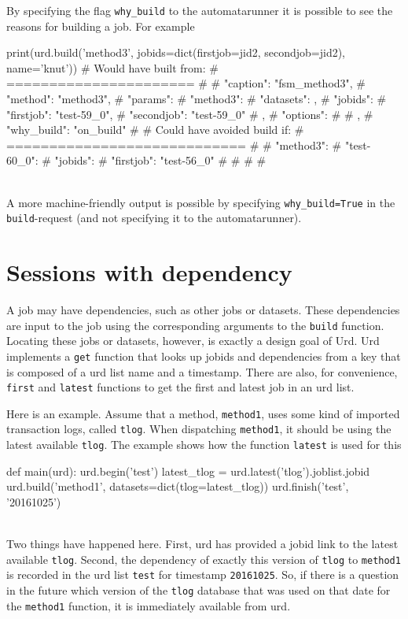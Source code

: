 By specifying the flag \texttt{why\_build} to the automatarunner it is
possible to see the reasons for building a job.  For example
\\
\begin{python}
  print(urd.build('method3', jobids=dict(firstjob=jid2, secondjob=jid2), name='knut'))
# Would have built from:
# ======================
# {
#     "caption": "fsm_method3", 
#     "method": "method3", 
#     "params": {
#         "method3": {
#             "datasets": {}, 
#             "jobids": {
#                 "firstjob": "test-59_0", 
#                 "secondjob": "test-59_0"
#             }, 
#             "options": {}
#         }
#     }, 
#     "why_build": "on_build"
# }
# Could have avoided build if:
# ============================
# {
#     "method3": {
#         "test-60_0": {
#             "jobids": {
#                 "firstjob": "test-56_0"
#             }
#         }
#     }
# }
\end{python}
\\
A more machine-friendly output is possible by specifying
\texttt{why\_build=True} in the \texttt{build}-request (and not
specifying it to the automatarunner).



\newpage
\section{Sessions with dependency}

A job may have dependencies, such as other jobs or datasets.  These
dependencies are input to the job using the corresponding arguments to
the \texttt{build} function.  Locating these jobs or datasets,
however, is exactly a design goal of Urd.  Urd implements a
\texttt{get} function that looks up jobids and dependencies from a key
that is composed of a urd list name and a timestamp.  There are also,
for convenience, \texttt{first} and \texttt{latest} functions to get
the first and latest job in an urd list.

Here is an example.  Assume that a method, \texttt{method1}, uses some
kind of imported transaction logs, called \texttt{tlog}.  When
dispatching \texttt{method1}, it should be using the latest available
\texttt{tlog}.  The example shows how the function \texttt{latest} is
used for this
\\
\begin{python}
def main(urd):
  urd.begin('test')
  latest_tlog = urd.latest('tlog').joblist.jobid
  urd.build('method1', datasets=dict(tlog=latest_tlog))
  urd.finish('test', '20161025')
\end{python}
\\
Two things have happened here.  First, urd has provided a jobid link
to the latest available \texttt{tlog}.  Second, the dependency of
exactly this version of \texttt{tlog} to \texttt{method1} is recorded
in the urd list \texttt{test} for timestamp \texttt{20161025}.  So, if
there is a question in the future which version of the \texttt{tlog}
database that was used on that date for the \texttt{method1} function,
it is immediately available from urd.

